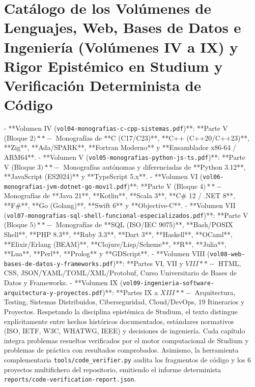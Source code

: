 \documentclass{book}
\begin{document}
\section{Catálogo de los Volúmenes de Lenguajes, Web, Bases de Datos e Ingeniería (Volúmenes IV a IX) y Rigor Epistémico en Studium y Verificación Determinista de Código}

- **Volumen IV (\texttt{vol04-monografias-c-cpp-sistemas.pdf})**: **Parte V (Bloque \(2)** -\) Monografías de **C (C17/C23)**, **C++ (C++20/C++23)**, **Zig**, **Ada/SPARK**, **Fortran Moderno** y **Ensamblador x86-64 / ARM64**.
- **Volumen V (\texttt{vol05-monografias-python-js-ts.pdf})**: **Parte V (Bloque \(3)** -\) Monografías autónomas y diferenciadas de **Python 3.12**, **JavaScript (ES2024)** y **TypeScript 5.x**.
- **Volumen VI (\texttt{vol06-monografias-jvm-dotnet-go-movil.pdf})**: **Parte V (Bloque \(4)** -\) Monografías de **Java 21**, **Kotlin**, **Scala 3**, **C\# 12 / .NET 8**, **F\#**, **Go (Golang)**, **Swift 6** y **Objective-C**.
- **Volumen VII (\texttt{vol07-monografias-sql-shell-funcional-especializados.pdf})**: **Parte V (Bloque \(5)** -\) Monografías de **SQL (ISO/IEC 9075)**, **Bash/POSIX Shell**, **PHP 8.3**, **Ruby 3.3**, **Dart 3**, **Haskell**, **OCaml**, **Elixir/Erlang (BEAM)**, **Clojure/Lisp/Scheme**, **R**, **Julia**, **Lua**, **Perl**, **Prolog** y **GDScript**.
- **Volumen VIII (\texttt{vol08-web-bases-de-datos-y-frameworks.pdf})**: **Partes VI, VII y \(VIII** -\) HTML, CSS, JSON/YAML/TOML/XML/Protobuf, Curso Universitario de Bases de Datos y Frameworks.
- **Volumen IX (\texttt{vol09-ingenieria-software-arquitectura-y-proyectos.pdf})**: **Partes IX a \(XIII** -\) Arquitectura, Testing, Sistemas Distribuidos, Ciberseguridad, Cloud/DevOps, 19 Itinerarios y Proyectos.
Respetando la disciplina epistémica de Studium, el texto distingue explícitamente entre hechos históricos documentados, estándares normativos (ISO, IETF, W3C, WHATWG, IEEE) y decisiones de ingeniería. Cada capítulo integra problemas resueltos verificados por el motor computacional de Studium y problemas de práctica con resultados comprobados. Asimismo, la herramienta complementaria \texttt{tools/code\_verifier.py} audita los fragmentos de código y los 6 proyectos multifichero del repositorio, emitiendo el informe determinista \texttt{reports/code-verification-report.json}.
\end{document}
